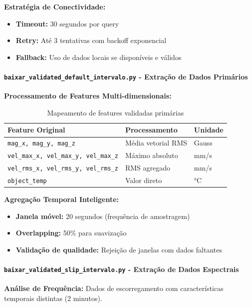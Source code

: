 \textbf{Estratégia de Conectividade:}
\begin{itemize}
    \item \textbf{Timeout:} 30 segundos por query
    \item \textbf{Retry:} Até 3 tentativas com backoff exponencial
    \item \textbf{Fallback:} Uso de dados locais se disponíveis e válidos
\end{itemize}

\paragraph{\texttt{baixar\_validated\_default\_intervalo.py} - Extração de Dados Primários}

\textbf{Processamento de Features Multi-dimensionais:}

\begin{table}[H]
\centering
\caption{Mapeamento de features validadas primárias}
\begin{tabular}{|l|l|l|}
\hline
\textbf{Feature Original} & \textbf{Processamento} & \textbf{Unidade} \\
\hline
\texttt{mag\_x, mag\_y, mag\_z} & Média vetorial RMS & Gauss \\
\texttt{vel\_max\_x, vel\_max\_y, vel\_max\_z} & Máximo absoluto & mm/s \\
\texttt{vel\_rms\_x, vel\_rms\_y, vel\_rms\_z} & RMS agregado & mm/s \\
\texttt{object\_temp} & Valor direto & °C \\
\hline
\end{tabular}
\end{table}

\textbf{Agregação Temporal Inteligente:}
\begin{itemize}
    \item \textbf{Janela móvel:} 20 segundos (frequência de amostragem)
    \item \textbf{Overlapping:} 50\% para suavização
    \item \textbf{Validação de qualidade:} Rejeição de janelas com dados faltantes
\end{itemize}

\paragraph{\texttt{baixar\_validated\_slip\_intervalo.py} - Extração de Dados Espectrais}

\textbf{Análise de Frequência:} Dados de escorregamento com características temporais distintas (2 minutos).

